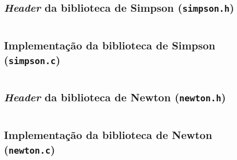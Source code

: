 \begin{apendicesenv}
		\subsection{\emph{Header} da biblioteca de Simpson (\texttt{simpson.h})}
		\label{subsec:simpson.h}
			\inputminted[autogobble,breaklines,linenos,frame=lines,tabsize=4,obeytabs=true,fontsize=\footnotesize
			]{c}{source_codes/simpson.h}

		\subsection{Implementação da biblioteca de Simpson (\texttt{simpson.c})}
			\label{subsec:simpson.c}
			\inputminted[autogobble,breaklines,linenos,frame=lines,tabsize=4,obeytabs=true,fontsize=\footnotesize
			]{c}{source_codes/simpson.c}

		\subsection{\emph{Header} da biblioteca de Newton (\texttt{newton.h})}
		\label{subsec:newton.h}
			\inputminted[autogobble,breaklines,linenos,frame=lines,tabsize=4,obeytabs=true,fontsize=\footnotesize
			]{c}{source_codes/newton.h}

		\subsection{Implementação da biblioteca de Newton (\texttt{newton.c})}
			\label{subsec:newton.c}
			\inputminted[autogobble,breaklines,linenos,frame=lines,tabsize=4,obeytabs=true,fontsize=\footnotesize
			]{c}{source_codes/newton.c}

\end{apendicesenv}
